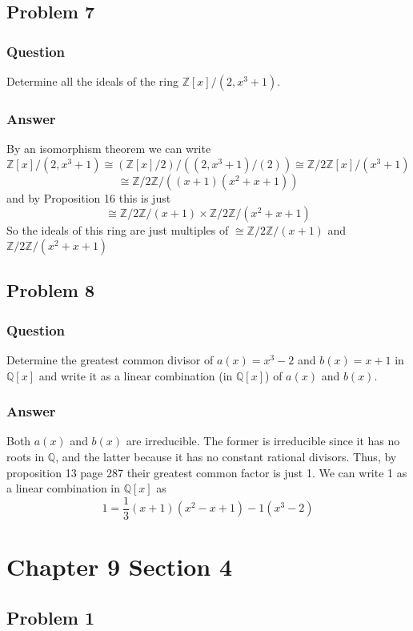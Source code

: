 \documentclass[12pt]{article}
\begin{document}
\subsection{Problem 7}

\subsubsection{Question}
Determine all the ideals of the ring $\mathbb{Z}[x]/(2,x^3+1)$.
\subsubsection{Answer}

By an isomorphism theorem we can write
\[\mathbb{Z}[x]/(2,x^3+1) \cong (\mathbb{Z}[x]/2)/((2,x^3+1)/(2)) \cong \mathbb{Z}/2\mathbb{Z}[x]/(x^3+1)\]
\[\cong \mathbb{Z}/ 2 \mathbb{Z} / ((x+1)(x^2+x+1))\]
and by Proposition 16 this is just
\[\cong \mathbb{Z}/ 2 \mathbb{Z} / (x+1) \times  \mathbb{Z}/ 2 \mathbb{Z} / (x^2+x+1)\]
So the ideals of this ring are just multiples of $\cong \mathbb{Z}/ 2 \mathbb{Z} / (x+1) $ and $  \mathbb{Z}/ 2 \mathbb{Z} / (x^2+x+1)$
\subsection{Problem 8}

\subsubsection{Question}
Determine the greatest common divisor of $a(x) = x^3 -2$ and $b(x)=x+1$ in $\mathbb{Q}[x]$ and write it as a linear combination (in $\mathbb{Q}[x]$) of $a(x)$ and $b(x)$.
\subsubsection{Answer}
Both $a(x) $ and $b(x)$ are irreducible. The former is irreducible since it has no roots in  $\mathbb{Q}$, and the latter because it has no constant rational divisors. Thus, by proposition 13 page 287 their greatest common factor is just 1. We can write 1 as a linear combination in $\mathbb{Q}[x]$ as 
\[1= \frac{1}{3} (x+1) (x^2-x+1)-1(x^3-2)\]

\section{Chapter 9 Section 4}
\subsection{Problem 1}
\end{document}

